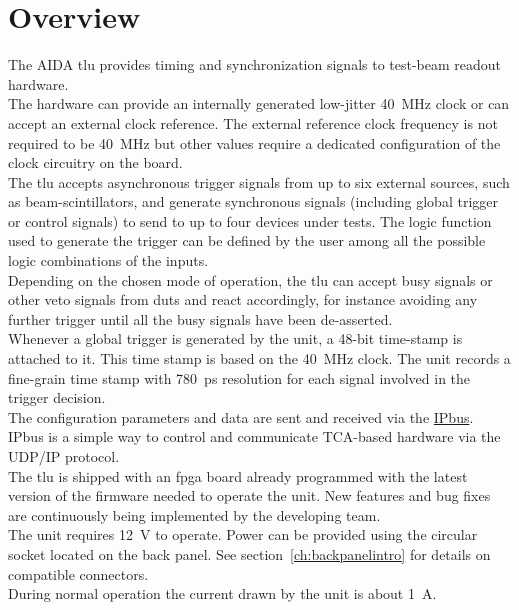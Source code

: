 \section{Overview}
The AIDA \gls{tlu} provides timing and synchronization signals to test-beam readout hardware.\\
The hardware can provide an internally generated low-jitter 40~MHz clock or can accept an external clock reference. The external reference clock frequency is not required to be 40~MHz but other values require a dedicated configuration of the clock circuitry on the board. \\
The \gls{tlu} accepts asynchronous trigger signals from up to six external sources, such as beam-scintillators, and generate synchronous signals (including global trigger or control signals) to send to up to four devices under tests. The logic function used to generate the trigger can be defined by the user among all the possible logic combinations of the inputs.\\
Depending on the chosen mode of operation, the \gls{tlu} can accept busy signals or other veto signals from \gls{dut}s and react accordingly, for instance avoiding any further trigger until all the busy signals have been de-asserted.\\
Whenever a global trigger is generated by the unit, a 48-bit time-stamp is attached to it. This time stamp is based on the 40~MHz clock. The unit records a fine-grain time stamp with 780~ps resolution for each signal involved in the trigger decision.\\
The configuration parameters and data are sent and received via the \href{https://www.ohwr.org/projects/ipbus}{IPbus}. IPbus is a simple way to control and communicate TCA-based hardware via the UDP/IP protocol.\\
The \gls{tlu} is shipped with an \gls{fpga} board already programmed with the latest version of the firmware needed to operate the unit. New features and bug fixes are continuously being implemented by the developing team.\\
The unit requires 12~V to operate. Power can be provided using the circular socket located on the back panel. See section~\ref{ch:backpanelintro} for details on compatible connectors.\\
During normal operation the current drawn by the unit is about 1~A.

